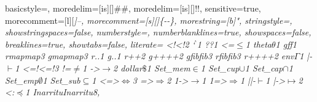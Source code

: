  {
	basicstyle=\ttfamily\codesize,
	moredelim=[is][\showfocus]{\#}{\#},
	moredelim=[is][\showlogic]{!}{!},
	sensitive=true,
	morecomment=[l][\ttfamily\itshape\codesize]{--},
	morecomment=[s][\ttfamily\itshape\codesize]{\{-}{-\}},
	morestring=[b]",
	stringstyle=\color{haskellstr},
	showstringspaces=false,
	numberstyle=\codesize,
	numberblanklines=true,
	showspaces=false,
	breaklines=true,
	showtabs=false,
  literate={
	         {<!}{{{\color{lcolor}<!}}}2
           {`}{{{$^{\backprime}{}$}}}1
           {?}{{{\color{lcolor}?}}}1
           {<=}{{$\leq$}}1
           {theta}{{$\theta$}}1
           {gf}{{{\color{lappascolor}f}}}1
           {rmap}{{{\color{lappcolor}map}}}3
           {gmap}{{{\color{lappascolor}map}}}3
           {r.}{{{\color{lappcolor}.}}}1
           {g.}{{{\color{lappascolor}.}}}1
           {r++}{{{\showfocus{++}}}}2
           {g++}{{{\color{lappascolor}++}}}2
           {gfib}{{{\color{lappascolor}fib}}}3
           {rfib}{{{\color{lappcolor}fib}}}3
           {r++}{{{\color{lappcolor}++}}}2
           {env}{{$\Gamma$}}1
           {|-}{{$\vdash$}}1
           {<=!}{{{\color{lcolor}<=!}}}3
           {!=}{{$\neq$}}1
           {->}{{$\rightarrow$}}2
           {dollar}{{$\texttt{\$}$}}1
           {Set_mem}{{$\in$}}1
           {Set_cup}{{$\cup$}}1
           {Set_cap}{{$\cap$}}1
           {Set_emp}{{$\emptyset$}}1
           {Set_sub}{{$\subseteq$}}1
           {<=>}{{$\Leftrightarrow$}}3
           {=>}{{$\Rightarrow$}}2
           {1->}{{$\rightarrow$}}1
           {1=>}{{$\Rightarrow$}}1
           {||-}{{$\vdash$}}1
           {|->}{{$\mapsto$}}2
           {<:}{{$\preceq$}}1
           {Inarritu}{Inarritu}8},
}
